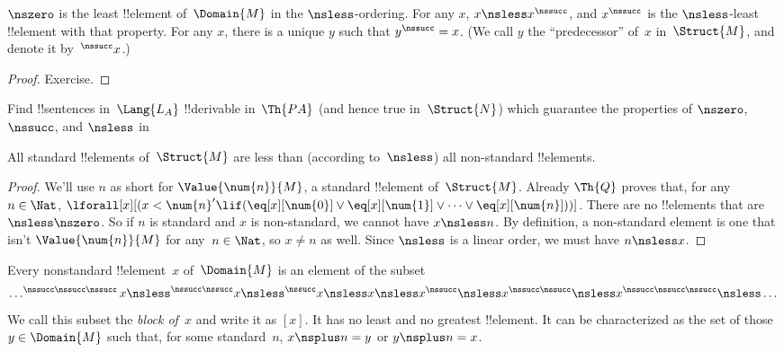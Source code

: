 \documentclass[../../../include/open-logic-section]{subfiles}
\begin{document}
\begin{prop}
 $\nszero$ is the least !!{element}
of~$\Domain{M}$ in the $\nsless$-ordering. For any $x$, $x \nsless
x^\nssucc$, and $x^\nssucc$ is the $\nsless$-least !!{element} with
that property.  For any $x$, there is a unique $y$ such that
$y^\nssucc = x$. (We call $y$ the ``predecessor'' of~$x$
in~$\Struct{M}$, and denote it by~$^\nssucc x$.)
\end{prop}

\begin{proof}
Exercise.  
\end{proof}

\begin{prob}
Find !!{sentence}s in~$\Lang{L_A}$ !!{derivable} in~$\Th{PA}$ (and
hence true in~$\Struct{N}$) which guarantee the properties of
$\nszero$, $\nssucc$, and $\nsless$ in
\end{prob}

\begin{prop}
All standard !!{element}s of~$\Struct{M}$ are less than (according
to~$\nsless$) all non-standard !!{element}s.
\end{prop}

\begin{proof}
We'll use $n$ as short for $\Value{\num{n}}{M}$, a standard
!!{element} of~$\Struct{M}$.  Already $\Th{Q}$ proves that, for any~$n
\in \Nat$, $\lforall[x][(x < \num{n}' \lif (\eq[x][\num{0}] \lor
  \eq[x][\num{1}] \lor \dots \lor \eq[x][\num{n}]))]$. There are no
!!{element}s that are $\nsless \nszero$. So if $n$ is standard and $x$
is non-standard, we cannot have $x \nsless n$. By definition, a
non-standard element is one that isn't $\Value{\num{n}}{M}$ for any~$n
\in \Nat$, so $x \neq n$ as well. Since $\nsless$ is a linear order,
we must have $n \nsless x$.
\end{proof}

\begin{prop}
Every nonstandard !!{element}~$x$ of~$\Domain{M}$ is an element of the subset
\[
\dots ^{\nssucc\nssucc\nssucc}x \nsless ^{\nssucc\nssucc}x \nsless
^{\nssucc}x \nsless x \nsless x^{\nssucc} \nsless x^{\nssucc\nssucc}
\nsless x^{\nssucc\nssucc\nssucc} \nsless \dots
\]
We call this subset the \emph{block of~$x$} and write it as $[x]$. It
has no least and no greatest !!{element}. It can be characterized as
the set of those $y \in \Domain{M}$ such that, for some standard~$n$,
$x \nsplus n = y$ or $y \nsplus n = x$.
\end{prop}
\end{document}
